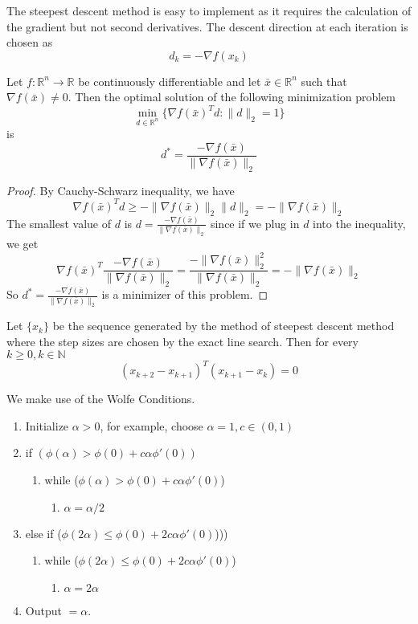 The steepest descent method is easy to implement as it requires the calculation of the gradient but not second derivatives. The descent direction at each iteration is chosen as $$d_k = - \nabla f(x_k)$$
\begin{lemma}
  Let $f: \mathbb R^n \to \mathbb R$ be continuously differentiable and let $\bar x \in \mathbb R^n$ such that $\nabla f(\bar x) \neq 0$. Then the optimal solution of the following minimization problem $$\min_{d \in \mathbb R^n} \{\nabla f(\bar x)^T d: \|d\|_2 = 1\}$$ is $$d^* = \frac{-\nabla f(\bar x)}{\|\nabla f(\bar x)\|_2}$$
\end{lemma}
\begin{proof}[Proof]
  By Cauchy-Schwarz inequality, we have
  $$\nabla f(\bar x)^T d \geq -\| \nabla f(\bar x)\|_2 \| d\|_2 = -\|\nabla f(\bar x)\|_2$$
  The smallest value of $d$ is $d = \frac{-\nabla f(\bar x)}{\|\nabla f(\bar x)\|_2}$ since if we plug in $d$ into the inequality, we get
  $$\nabla f(\bar x)^T \frac{-\nabla f(\bar x)}{\|\nabla f(\bar x)\|_2} = \frac{-\|\nabla f(\bar x)\|^2_2}{\|\nabla f(\bar x)\|_2}=-\|\nabla f(\bar x)\|_2$$
  So $d^* = \frac{-\nabla f(\bar x)}{\|\nabla f(\bar x)\|_2}$ is a minimizer of this problem.
\end{proof}
\begin{theorem}[]
  Let $\{x_k\}$ be the sequence generated by the method of steepest descent method where the step sizes are chosen by the exact line search. Then for every $k \geq 0, k \in \mathbb N$ $$(x_{k+2} - x_{k+1})^T (x_{k+1} - x_k) = 0$$
\end{theorem}
\begin{definition}
  We make use of the Wolfe Conditions.
  \begin{enumerate}
  \item Initialize $\alpha > 0$, for example, choose $\alpha = 1, c \in (0,1)$
  \item if $(\phi(\alpha) > \phi(0) + c\alpha \phi'(0))$
  \begin{enumerate}
    \item while ($\phi(\alpha) > \phi(0) + c\alpha \phi'(0)$)
    \begin{enumerate}
      \item $\alpha = \alpha / 2$
    \end{enumerate}
  \end{enumerate}
  \item else if ($\phi(2\alpha) \leq \phi(0) + 2c\alpha \phi'(0)$)))
  \begin{enumerate}
    \item while ($\phi(2\alpha) \leq \phi(0) + 2c\alpha \phi'(0)$)
    \begin{enumerate}
      \item $\alpha = 2\alpha$
    \end{enumerate}
  \end{enumerate}
  \item Output $= \alpha$.
\end{enumerate}
\end{definition}
